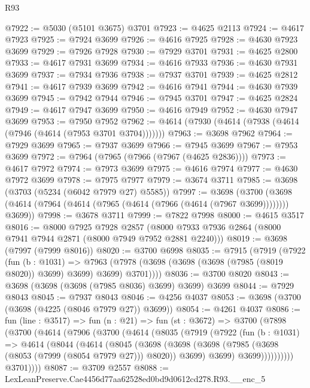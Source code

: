 \begin{lexlean}{R93}
\begin{coremodule}
@7922 := @5030 (@5101 @3675) @3701
@7923 := @4625 @2113
@7924 := @4617 @7923
@7925 := @7924 @3699
@7926 := @4616 @7925
@7928 := @4630 @7923 @3699
@7929 := @7926 @7928
@7930 := @7929 @3701
@7931 := @4625 @2800
@7933 := @4617 @7931 @3699
@7934 := @4616 @7933
@7936 := @4630 @7931 @3699
@7937 := @7934 @7936
@7938 := @7937 @3701
@7939 := @4625 @2812
@7941 := @4617 @7939 @3699
@7942 := @4616 @7941
@7944 := @4630 @7939 @3699
@7945 := @7942 @7944
@7946 := @7945 @3701
@7947 := @4625 @2824
@7949 := @4617 @7947 @3699
@7950 := @4616 @7949
@7952 := @4630 @7947 @3699
@7953 := @7950 @7952
@7962 := @4614 (@7930 (@4614 (@7938 (@4614 (@7946 (@4614 (@7953 @3701 @3704)))))))
@7963 := @3698 @7962
@7964 := @7929 @3699
@7965 := @7937 @3699
@7966 := @7945 @3699
@7967 := @7953 @3699
@7972 := @7964 (@7965 (@7966 (@7967 (@4625 @2836))))
@7973 := @4617 @7972
@7974 := @7973 @3699
@7975 := @4616 @7974
@7977 := @4630 @7972 @3699
@7978 := @7975 @7977
@7979 := @3674 @3711
@7985 := @3698 (@3703 (@5234 (@6042 @7979 @27) @5585))
@7997 := @3698
    (@3700 (@3698 (@4614 (@7964 (@4614 (@7965 (@4614 (@7966 (@4614 (@7967 @3699)))))))) @3699))
@7998 := @3678 @3711
@7999 := @7822 @7998
@8000 := @4615 @3517
@8016 := @8000
    @7925
    @7928
    @2857
    (@8000 @7933 @7936 @2864 (@8000 @7941 @7944 @2871 (@8000 @7949 @7952 @2881 @2240)))
@8019 := @3698 (@7997 (@7999 @8016))
@8020 := @3700 @6998
@8035 := @7915
    (@7919
      (@7922
        (fun (b : @1031) =>
        @7963 (@7978 (@3698 (@3698 (@3698 (@7985 (@8019 @8020)) @3699) @3699) @3699) @3701))))
@8036 := @3700 @8020
@8043 := @3698 (@3698 (@3698 (@7985 @8036) @3699) @3699) @3699
@8044 := @7929 @8043
@8045 := @7937 @8043
@8046 := @4256 @4037
@8053 := @3698 (@3700 (@3698 (@4225 (@8046 @7979 @27)) @3699))
@8054 := @4261 @4037
@8086 := fun (line : @3517) =>
  fun (n : @21) =>
  fun (st : @3672) =>
  @3700
    (@7898
      (@3700
        (@4614
          (@7906
            (@3700
              (@4614
                (@8035
                  (@7919
                    (@7922
                      (fun (b : @1031) =>
                      @4614
                        (@8044
                          (@4614
                            (@8045
                              (@3698
                                (@3698
                                  (@3698
                                    (@7985 (@3698 (@8053 (@7999 (@8054 @7979 @27))) @8020))
                                    @3699)
                                  @3699)
                                @3699))))))))))
            @3701))))
@8087 := @3709 @2557
@8088 := LexLeanPreserve.Cae4456d77aa62528ed0bd9d0612cd278.R93.__enc_5

\end{coremodule}
\end{lexlean}
